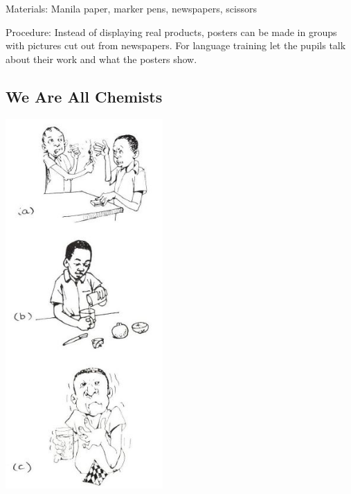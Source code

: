 \begin{multicols}{2}
\begin{description*}
\item[Materials:]{Manila paper, marker pens, newspapers, scissors}
\item[Procedure:]{Instead of displaying real products, posters
can be made in groups with pictures cut out
from newspapers. For language training let the
pupils talk about their work and what the posters
show.}
\end{description*}

\subsection{We Are All Chemists}

\begin{center}
\includegraphics[width=0.45\textwidth]{./img/source/all-chemists.jpg}
\end{center}


\end{multicols}
